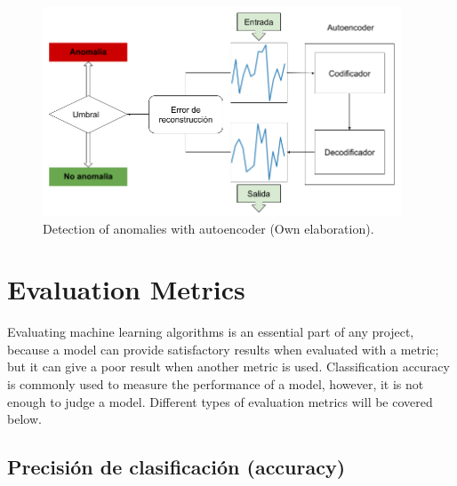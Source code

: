 \begin{figure}[h!]
  \begin{center}	\includegraphics[width=0.95\textwidth, frame]{imagenes/Cap4/autoencoder-anomaly}
  \caption{Detection of anomalies with autoencoder (Own elaboration).} 
  \label{fig:autoencoder-anomaly}
  \end{center}
\end{figure}


\section{Evaluation Metrics}

Evaluating machine learning algorithms is an essential part of any project, because a model can provide satisfactory results when evaluated with a metric; but it can give a poor result when another metric is used. Classification accuracy is commonly used to measure the performance of a model, however, it is not enough to judge a model. Different types of evaluation metrics will be covered below.

\subsection{Precisi\'{o}n de clasificaci\'{o}n (accuracy)}

